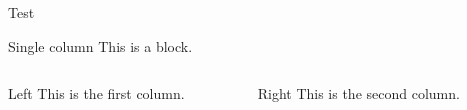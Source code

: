 \documentclass{beamer}
\begin{document}
    \begin{frame}{Test}
        \begin{block}{Single column}
            This is a block.
        \end{block}
        \begin{columns}[onlytextwidth]
            \begin{column}{0.45\textwidth}
                \begin{exampleblock}{Left}
                    This is the first column.
                \end{exampleblock}
            \end{column}
            \begin{column}{0.45\textwidth}
                \begin{exampleblock}{Right}
                    This is the second column.
                \end{exampleblock}
            \end{column}
        \end{columns}
    \end{frame}
\end{document}
